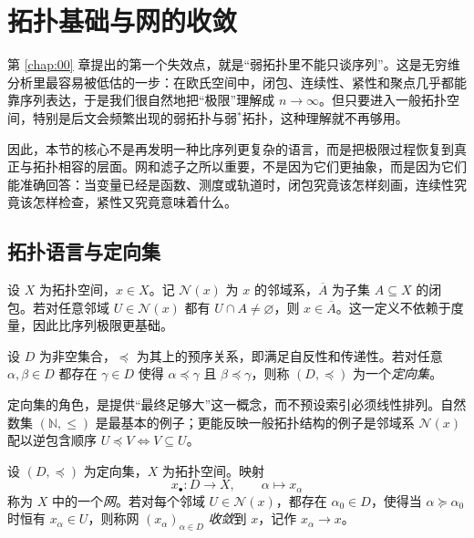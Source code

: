 \section{拓扑基础与网的收敛}

\label{sec:1-1}

第 \ref{chap:00} 章提出的第一个失效点，就是“弱拓扑里不能只谈序列”。这是无穷维分析里最容易被低估的一步：在欧氏空间中，闭包、连续性、紧性和聚点几乎都能靠序列表达，于是我们很自然地把“极限”理解成 $n\to\infty$。但只要进入一般拓扑空间，特别是后文会频繁出现的弱拓扑与弱$^\ast$拓扑，这种理解就不再够用。

因此，本节的核心不是再发明一种比序列更复杂的语言，而是把极限过程恢复到真正与拓扑相容的层面。网和滤子之所以重要，不是因为它们更抽象，而是因为它们能准确回答：当变量已经是函数、测度或轨道时，闭包究竟该怎样刻画，连续性究竟该怎样检查，紧性又究竟意味着什么。

\subsection{拓扑语言与定向集}

设 $X$ 为拓扑空间，$x\in X$。记 $\mathcal N(x)$ 为 $x$ 的邻域系，$\overline{A}$ 为子集 $A\subseteq X$ 的闭包。若对任意邻域 $U\in\mathcal N(x)$ 都有 $U\cap A\neq\varnothing$，则 $x\in \overline{A}$。这一定义不依赖于度量，因此比序列极限更基础。

\begin{definition}[定向集]\label{def:directed-set}
设 $D$ 为非空集合，$\preceq$ 为其上的预序关系，即满足自反性和传递性。若对任意 $\alpha,\beta\in D$ 都存在 $\gamma\in D$ 使得 $\alpha\preceq\gamma$ 且 $\beta\preceq\gamma$，则称 $(D,\preceq)$ 为一个\emph{定向集}。
\end{definition}

定向集的角色，是提供“最终足够大”这一概念，而不预设索引必须线性排列。自然数集 $(\mathbb N,\le)$ 是最基本的例子；更能反映一般拓扑结构的例子是邻域系 $\mathcal N(x)$ 配以逆包含顺序 $U\preceq V \iff V\subseteq U$。

\begin{definition}[网与网收敛]\label{def:net-convergence}
设 $(D,\preceq)$ 为定向集，$X$ 为拓扑空间。映射
\[
x_\bullet\colon D\to X,\qquad \alpha\mapsto x_\alpha
\]
称为 $X$ 中的一个\emph{网}。若对每个邻域 $U\in\mathcal N(x)$，都存在 $\alpha_0\in D$，使得当 $\alpha\succeq\alpha_0$ 时恒有 $x_\alpha\in U$，则称网 $(x_\alpha)_{\alpha\in D}$ \emph{收敛}到 $x$，记作 $x_\alpha\to x$。
\end{definition}


